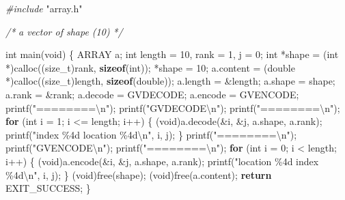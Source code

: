 \documentclass[
  12pt,
]{article}
\newenvironment{Shaded}{\begin{snugshade}}{\end{snugshade}}
\newcommand{\CommentTok}[1]{\textcolor[rgb]{0.56,0.35,0.01}{\textit{#1}}}
\newcommand{\ControlFlowTok}[1]{\textcolor[rgb]{0.13,0.29,0.53}{\textbf{#1}}}
\newcommand{\DataTypeTok}[1]{\textcolor[rgb]{0.13,0.29,0.53}{#1}}
\newcommand{\DecValTok}[1]{\textcolor[rgb]{0.00,0.00,0.81}{#1}}
\newcommand{\ImportTok}[1]{#1}
\newcommand{\KeywordTok}[1]{\textcolor[rgb]{0.13,0.29,0.53}{\textbf{#1}}}
\newcommand{\NormalTok}[1]{#1}
\newcommand{\PreprocessorTok}[1]{\textcolor[rgb]{0.56,0.35,0.01}{\textit{#1}}}
\newcommand{\SpecialCharTok}[1]{\textcolor[rgb]{0.00,0.00,0.00}{#1}}
\newcommand{\StringTok}[1]{\textcolor[rgb]{0.31,0.60,0.02}{#1}}
\begin{document}
\begin{Shaded}
\begin{Highlighting}[]
\PreprocessorTok{\#include }\ImportTok{"array.h"}

\CommentTok{/*}
\CommentTok{  a vector of shape (10)}
\CommentTok{*/}

\DataTypeTok{int}\NormalTok{ main(}\DataTypeTok{void}\NormalTok{) \{}
\NormalTok{  ARRAY a;}
  \DataTypeTok{int}\NormalTok{ length = }\DecValTok{10}\NormalTok{, rank = }\DecValTok{1}\NormalTok{, j = }\DecValTok{0}\NormalTok{;}
  \DataTypeTok{int}\NormalTok{ *shape = (}\DataTypeTok{int}\NormalTok{ *)calloc((}\DataTypeTok{size\_t}\NormalTok{)rank, }\KeywordTok{sizeof}\NormalTok{(}\DataTypeTok{int}\NormalTok{));}
\NormalTok{  *shape = }\DecValTok{10}\NormalTok{;}
\NormalTok{  a.content = (}\DataTypeTok{double}\NormalTok{ *)calloc((}\DataTypeTok{size\_t}\NormalTok{)length, }\KeywordTok{sizeof}\NormalTok{(}\DataTypeTok{double}\NormalTok{));}
\NormalTok{  a.length = \&length;}
\NormalTok{  a.shape = shape;}
\NormalTok{  a.rank = \&rank;}
\NormalTok{  a.decode = GVDECODE;}
\NormalTok{  a.encode = GVENCODE;}
\NormalTok{  printf(}\StringTok{"========}\SpecialCharTok{\textbackslash{}n}\StringTok{"}\NormalTok{);}
\NormalTok{  printf(}\StringTok{"GVDECODE}\SpecialCharTok{\textbackslash{}n}\StringTok{"}\NormalTok{);}
\NormalTok{  printf(}\StringTok{"========}\SpecialCharTok{\textbackslash{}n}\StringTok{"}\NormalTok{);}
  \ControlFlowTok{for}\NormalTok{ (}\DataTypeTok{int}\NormalTok{ i = }\DecValTok{1}\NormalTok{; i \textless{}= length; i++) \{}
\NormalTok{    (}\DataTypeTok{void}\NormalTok{)a.decode(\&i, \&j, a.shape, a.rank);}
\NormalTok{    printf(}\StringTok{"index \%4d location \%4d}\SpecialCharTok{\textbackslash{}n}\StringTok{"}\NormalTok{, i, j);}
\NormalTok{  \}}
\NormalTok{  printf(}\StringTok{"========}\SpecialCharTok{\textbackslash{}n}\StringTok{"}\NormalTok{);}
\NormalTok{  printf(}\StringTok{"GVENCODE}\SpecialCharTok{\textbackslash{}n}\StringTok{"}\NormalTok{);}
\NormalTok{  printf(}\StringTok{"========}\SpecialCharTok{\textbackslash{}n}\StringTok{"}\NormalTok{);}
  \ControlFlowTok{for}\NormalTok{ (}\DataTypeTok{int}\NormalTok{ i = }\DecValTok{0}\NormalTok{; i \textless{} length; i++) \{}
\NormalTok{    (}\DataTypeTok{void}\NormalTok{)a.encode(\&i, \&j, a.shape, a.rank);}
\NormalTok{    printf(}\StringTok{"location \%4d index \%4d}\SpecialCharTok{\textbackslash{}n}\StringTok{"}\NormalTok{, i, j);}
\NormalTok{  \}}
\NormalTok{  (}\DataTypeTok{void}\NormalTok{)free(shape);}
\NormalTok{  (}\DataTypeTok{void}\NormalTok{)free(a.content);}
  \ControlFlowTok{return}\NormalTok{ EXIT\_SUCCESS;}
\NormalTok{\}}
\end{Highlighting}
\end{Shaded}
\end{document}
